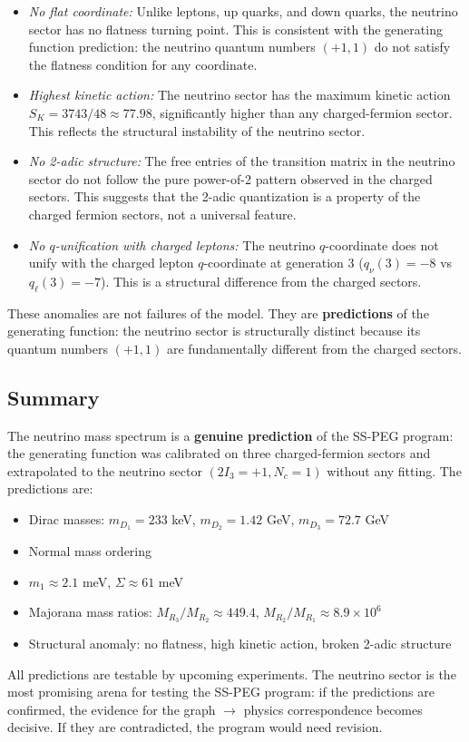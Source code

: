\begin{itemize}
\item \textit{No flat coordinate:} Unlike leptons, up quarks, and down quarks, the neutrino sector has no flatness turning point. This is consistent with the generating function prediction: the neutrino quantum numbers $(+1, 1)$ do not satisfy the flatness condition for any coordinate.

\item \textit{Highest kinetic action:} The neutrino sector has the maximum kinetic action $S_K = 3743/48 \approx 77.98$, significantly higher than any charged-fermion sector. This reflects the structural instability of the neutrino sector.

\item \textit{No 2-adic structure:} The free entries of the transition matrix in the neutrino sector do not follow the pure power-of-2 pattern observed in the charged sectors. This suggests that the 2-adic quantization is a property of the charged fermion sectors, not a universal feature.

\item \textit{No $q$-unification with charged leptons:} The neutrino $q$-coordinate does not unify with the charged lepton $q$-coordinate at generation 3 ($q_\nu(3) = -8$ vs $q_\ell(3) = -7$). This is a structural difference from the charged sectors.
\end{itemize}

These anomalies are not failures of the model. They are \textbf{predictions} of the generating function: the neutrino sector is structurally distinct because its quantum numbers $(+1, 1)$ are fundamentally different from the charged sectors.

\subsection{Summary}\label{app:nu_summary}

The neutrino mass spectrum is a \textbf{genuine prediction} of the SS-PEG program: the generating function was calibrated on three charged-fermion sectors and extrapolated to the neutrino sector $(2I_3 = +1, N_c = 1)$ without any fitting. The predictions are:
\begin{itemize}
\item Dirac masses: $m_{D_1} = 233$ keV, $m_{D_2} = 1.42$ GeV, $m_{D_3} = 72.7$ GeV
\item Normal mass ordering
\item $m_1 \approx 2.1$ meV, $\Sigma \approx 61$ meV
\item Majorana mass ratios: $M_{R_3}/M_{R_2} \approx 449.4$, $M_{R_2}/M_{R_1} \approx 8.9 \times 10^6$
\item Structural anomaly: no flatness, high kinetic action, broken 2-adic structure
\end{itemize}

All predictions are testable by upcoming experiments. The neutrino sector is the most promising arena for testing the SS-PEG program: if the predictions are confirmed, the evidence for the graph $\to$ physics correspondence becomes decisive. If they are contradicted, the program would need revision.
